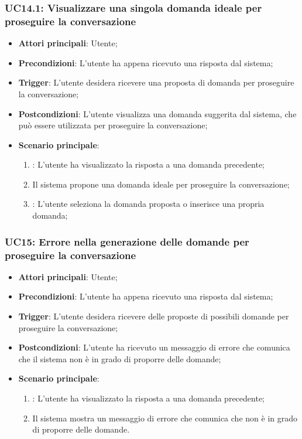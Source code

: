 \hypertarget{UC14.1}{}
\subsubsection{UC14.1: Visualizzare una singola domanda ideale per proseguire la conversazione}

\begin{itemize}
    \item \textbf{Attori principali}: Utente;
    \item \textbf{Precondizioni}: L'utente ha appena ricevuto una risposta dal sistema;
    \item \textbf{Trigger}: L'utente desidera ricevere una proposta di domanda per proseguire la conversazione;
    \item \textbf{Postcondizioni}: L'utente visualizza una domanda suggerita dal sistema, che può essere utilizzata per proseguire la conversazione;
    \item \textbf{Scenario principale}:
    \begin{enumerate}
        \item {}: L'utente ha visualizzato la risposta a una domanda precedente;
        \item Il sistema propone una domanda ideale per proseguire la conversazione;
        \item {}: L'utente seleziona la domanda proposta o inserisce una propria domanda;
    \end{enumerate}
\end{itemize}

\hypertarget{UC15}{}
\subsubsection{UC15: Errore nella generazione delle domande per proseguire la conversazione}
\begin{itemize}
    \item \textbf{Attori principali}: Utente;
    \item \textbf{Precondizioni}: L'utente ha appena ricevuto una risposta dal sistema;
    \item \textbf{Trigger}: L'utente desidera ricevere delle proposte di possibili domande per proseguire la conversazione;
    \item \textbf{Postcondizioni}: L'utente ha ricevuto un messaggio di errore che comunica che il sistema non è in grado di proporre delle domande;
    \item \textbf{Scenario principale}:
    \begin{enumerate}
        \item {}: L'utente ha visualizzato la risposta a una domanda precedente;
        \item Il sistema mostra un messaggio di errore che comunica che non è in grado di proporre delle domande.
    \end{enumerate}
\end{itemize}